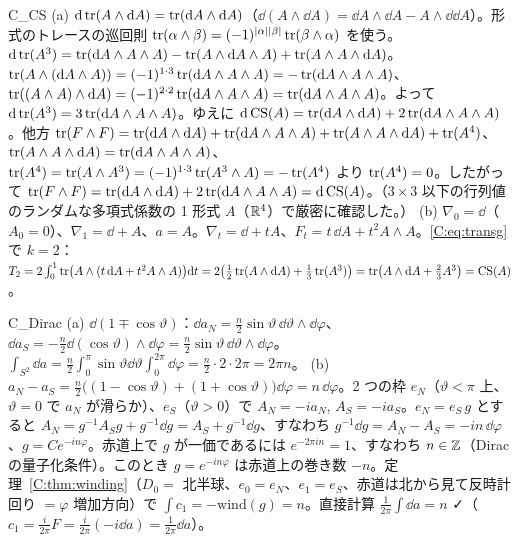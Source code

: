 \begin{soll}{C_CS}
(a) $\mathrm{d}\operatorname{tr}(A\wedge\mathrm{d} A)=\operatorname{tr}(\mathrm{d} A\wedge\mathrm{d} A)$（$\dd(A\wedge\dd A)=\dd A\wedge\dd A-A\wedge\dd\dd A$）。形式のトレースの巡回則 $\operatorname{tr}(\alpha\wedge\beta)=(-1)^{|\alpha||\beta|}\operatorname{tr}(\beta\wedge\alpha)$ を使う。$\mathrm{d}\operatorname{tr}(A^3)=\operatorname{tr}(\mathrm{d} A\wedge A\wedge A)-\operatorname{tr}(A\wedge\mathrm{d} A\wedge A)+\operatorname{tr}(A\wedge A\wedge\mathrm{d} A)$。$\operatorname{tr}(A\wedge(\mathrm{d} A\wedge A))=(-1)^{1\cdot3}\operatorname{tr}(\mathrm{d} A\wedge A\wedge A)=-\operatorname{tr}(\mathrm{d} A\wedge A\wedge A)$、$\operatorname{tr}((A\wedge A)\wedge\mathrm{d} A)=(-1)^{2\cdot2}\operatorname{tr}(\mathrm{d} A\wedge A\wedge A)=\operatorname{tr}(\mathrm{d} A\wedge A\wedge A)$。よって $\mathrm{d}\operatorname{tr}(A^3)=3\operatorname{tr}(\mathrm{d} A\wedge A\wedge A)$。ゆえに $\mathrm{d}\,\mathrm{CS}(A)=\operatorname{tr}(\mathrm{d} A\wedge\mathrm{d} A)+2\operatorname{tr}(\mathrm{d} A\wedge A\wedge A)$。他方 $\operatorname{tr}(F\wedge F)=\operatorname{tr}(\mathrm{d} A\wedge\mathrm{d} A)+\operatorname{tr}(\mathrm{d} A\wedge A\wedge A)+\operatorname{tr}(A\wedge A\wedge\mathrm{d} A)+\operatorname{tr}(A^4)$、$\operatorname{tr}(A\wedge A\wedge\mathrm{d} A)=\operatorname{tr}(\mathrm{d} A\wedge A\wedge A)$、$\operatorname{tr}(A^4)=\operatorname{tr}(A\wedge A^3)=(-1)^{1\cdot3}\operatorname{tr}(A^3\wedge A)=-\operatorname{tr}(A^4)$ より $\operatorname{tr}(A^4)=0$。したがって $\operatorname{tr}(F\wedge F)=\operatorname{tr}(\mathrm{d} A\wedge\mathrm{d} A)+2\operatorname{tr}(\mathrm{d} A\wedge A\wedge A)=\mathrm{d}\,\mathrm{CS}(A)$。（$3\times3$ 以下の行列値のランダムな多項式係数の 1 形式 $A$（$\mathbb R^4$）で厳密に確認した。）
(b) $\nabla_0=\dd$（$A_0=0$）、$\nabla_1=\dd+A$、$a=A$。$\nabla_t=\dd+tA$、$F_t=t\,\dd A+t^2A\wedge A$。\eqref{C:eq:transg} で $k=2$：$T_2=2\int_0^1\operatorname{tr}\bigl(A\wedge(t\,\mathrm{d} A+t^2A\wedge A)\bigr)\mathrm{d} t=2\bigl(\tfrac12\operatorname{tr}(A\wedge\mathrm{d} A)+\tfrac13\operatorname{tr}(A^3)\bigr)=\operatorname{tr}\bigl(A\wedge\mathrm{d} A+\tfrac23A^3\bigr)=\mathrm{CS}(A)$。
\end{soll}

\begin{soll}{C_Dirac}
(a) $\dd(1\mp\cos\vartheta)$：$\dd a_N=\frac n2\sin\vartheta\,\dd\vartheta\wedge\dd\varphi$、$\dd a_S=-\frac n2\dd(\cos\vartheta)\wedge\dd\varphi=\frac n2\sin\vartheta\,\dd\vartheta\wedge\dd\varphi$。$\int_{S^2}\dd a=\frac n2\int_0^\pi\sin\vartheta\dd\vartheta\int_0^{2\pi}\dd\varphi=\frac n2\cdot2\cdot2\pi=2\pi n$。
(b) $a_N-a_S=\frac n2\bigl((1-\cos\vartheta)+(1+\cos\vartheta)\bigr)\dd\varphi=n\,\dd\varphi$。2 つの枠 $e_N$（$\vartheta<\pi$ 上、$\vartheta=0$ で $a_N$ が滑らか）、$e_S$（$\vartheta>0$）で $A_N=-ia_N$, $A_S=-ia_S$。$e_N=e_S\,g$ とすると $A_N=g^{-1}A_Sg+g^{-1}\dd g=A_S+g^{-1}\dd g$、すなわち $g^{-1}\dd g=A_N-A_S=-in\,\dd\varphi$、$g=Ce^{-in\varphi}$。赤道上で $g$ が一価であるには $e^{-2\pi in}=1$、すなわち $n\in\mathbb Z$（Dirac の量子化条件）。このとき $g=e^{-in\varphi}$ は赤道上の巻き数 $-n$。定理~\ref{C:thm:winding}（$D_0=$ 北半球、$e_0=e_N$、$e_1=e_S$、赤道は北から見て反時計回り $=\varphi$ 増加方向）で $\int c_1=-\mathrm{wind}(g)=n$。直接計算 $\frac1{2\pi}\int\dd a=n$ ✓（$c_1=\frac i{2\pi}F=\frac i{2\pi}(-i\dd a)=\frac1{2\pi}\dd a$）。
\end{soll}

